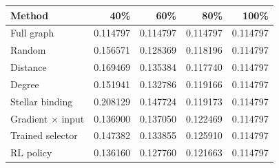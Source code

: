 \begin{tabular}{lrrrr}
\toprule
Method & 40\% & 60\% & 80\% & 100\% \\
\midrule
Full graph & 0.114797 & 0.114797 & 0.114797 & 0.114797 \\
Random & 0.156571 & 0.128369 & 0.118196 & 0.114797 \\
Distance & 0.169469 & 0.135384 & 0.117740 & 0.114797 \\
Degree & 0.151941 & 0.132786 & 0.119166 & 0.114797 \\
Stellar binding & 0.208129 & 0.147724 & 0.119173 & 0.114797 \\
Gradient $\times$ input & 0.136900 & 0.137050 & 0.122469 & 0.114797 \\
Trained selector & 0.147382 & 0.133855 & 0.125910 & 0.114797 \\
RL policy & 0.136160 & 0.127760 & 0.121663 & 0.114797 \\
\bottomrule
\end{tabular}

